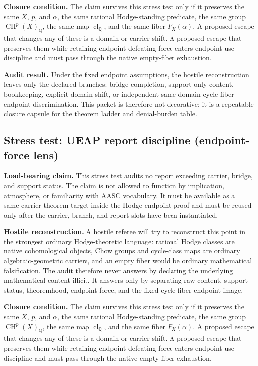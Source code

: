\documentclass[11pt]{article}
\newcommand{\QQ}{\mathbb{Q}}
\newcommand{\CH}{\operatorname{CH}}
\newcommand{\clQ}{\operatorname{cl}_{\QQ}}
\begin{document}
\par\noindent\textbf{Closure condition.} The claim survives this stress test only if it preserves the same $X$, $p$, and $\alpha$, the same rational Hodge-standing predicate, the same group $\CH^p(X)_\QQ$, the same map $\clQ$, and the same fiber $F_X(\alpha)$. A proposed escape that changes any of these is a domain or carrier shift. A proposed escape that preserves them while retaining endpoint-defeating force enters endpoint-use discipline and must pass through the native empty-fiber exhaustion.

\par\noindent\textbf{Audit result.} Under the fixed endpoint assumptions, the hostile reconstruction leaves only the declared branches: bridge completion, support-only content, bookkeeping, explicit domain shift, or independent same-domain cycle-fiber endpoint discrimination. This packet is therefore not decorative; it is a repeatable closure capsule for the theorem ladder and denial-burden table.


\subsection{Stress test: UEAP report discipline (endpoint-force lens)}

\par\noindent\textbf{Load-bearing claim.} This stress test audits no report exceeding carrier, bridge, and support status. The claim is not allowed to function by implication, atmosphere, or familiarity with AASC vocabulary. It must be available as a same-carrier theorem target inside the Hodge endpoint proof and must be reused only after the carrier, branch, and report slots have been instantiated.

\par\noindent\textbf{Hostile reconstruction.} A hostile referee will try to reconstruct this point in the strongest ordinary Hodge-theoretic language: rational Hodge classes are native cohomological objects, Chow groups and cycle-class maps are ordinary algebraic-geometric carriers, and an empty fiber would be ordinary mathematical falsification. The audit therefore never answers by declaring the underlying mathematical content illicit. It answers only by separating raw content, support status, theoremhood, endpoint force, and the fixed cycle-fiber endpoint image.

\par\noindent\textbf{Closure condition.} The claim survives this stress test only if it preserves the same $X$, $p$, and $\alpha$, the same rational Hodge-standing predicate, the same group $\CH^p(X)_\QQ$, the same map $\clQ$, and the same fiber $F_X(\alpha)$. A proposed escape that changes any of these is a domain or carrier shift. A proposed escape that preserves them while retaining endpoint-defeating force enters endpoint-use discipline and must pass through the native empty-fiber exhaustion.
\end{document}
